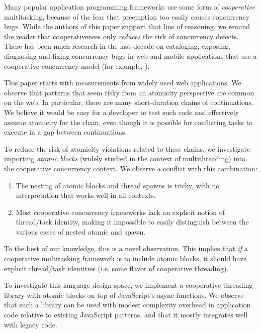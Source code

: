 \documentclass[acmsmall,anonymous,review]{acmart}\settopmatter{printfolios=true,printccs=false,printacmref=false}
\begin{document}
Many popular application programming frameworks use some form of \emph{cooperative} multitasking, because of the fear that preemption too easily causes concurrency bugs.
While the authors of this paper support that line of reasoning, we remind the reader that cooperativeness only \emph{reduces} the risk of concurrency defects\footnotemark{}.
There has been much research in the last decade on cataloging, exposing, diagnosing and fixing concurrency bugs in web and mobile applications that use a cooperative concurrency model (for example, \cite{Hsiao2014, Petrov2012, Mutlu2015}).


This paper starts with measurements from widely used web applications\footnotemark{}.
We observe that patterns that seem risky from an atomicity perspective are common on the web.
In particular, there are many short-duration chains of continuations.
We believe it would be easy for a developer to test such code and effectively assume atomicity for the chain, even though it is possible for conflicting tasks to execute in a gap between continuations.


To reduce the risk of atomicity violations related to these chains, we investigate importing \emph{atomic blocks} (widely studied in the context of multithreading) into the cooperative concurrency context.
We observe a conflict with this combination:
\begin{enumerate}
\item The nesting of atomic blocks and thread spawns is tricky, with no interpretation that works well in all contexts.
\item Most cooperative concurrency frameworks lack an explicit notion of thread/task identity, making it impossible to easily distinguish between the various cases of nested atomic and spawn.
\end{enumerate}
To the best of our knowledge, this is a novel observation.
This implies that \emph{if} a cooperative multitasking framework is to include atomic blocks, it should have explicit thread/task identities (i.e. some flavor of cooperative threading).

To investigate this language design space, we implement a cooperative threading library with atomic blocks on top of JavaScript's async functions.
We observe that such a library can be used with modest complexity overhead in application code relative to existing JavaScript patterns, and that it mostly integrates well with legacy code.
\end{document}
